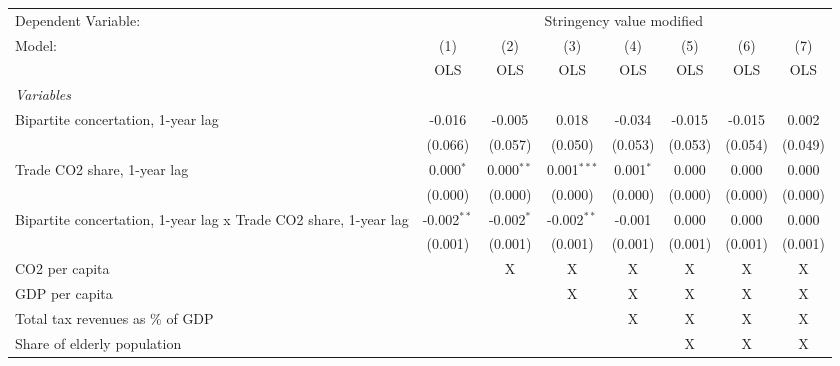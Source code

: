 
\begingroup
\centering
\begin{tabular}{lccccccc}
   \toprule
   Dependent Variable: & \multicolumn{7}{c}{Stringency value modified}\\
   Model:                                                           & (1)           & (2)          & (3)           & (4)         & (5)     & (6)     & (7)\\  
                                                                    &  OLS          & OLS          & OLS           & OLS         & OLS     & OLS     & OLS\\  
   \midrule
   \emph{Variables}\\
   Bipartite concertation, 1-year lag                               & -0.016        & -0.005       & 0.018         & -0.034      & -0.015  & -0.015  & 0.002\\   
                                                                    & (0.066)       & (0.057)      & (0.050)       & (0.053)     & (0.053) & (0.054) & (0.049)\\   
   Trade CO2 share, 1-year lag                                      & 0.000$^{*}$   & 0.000$^{**}$ & 0.001$^{***}$ & 0.001$^{*}$ & 0.000   & 0.000   & 0.000\\   
                                                                    & (0.000)       & (0.000)      & (0.000)       & (0.000)     & (0.000) & (0.000) & (0.000)\\   
   Bipartite concertation, 1-year lag x Trade CO2 share, 1-year lag & -0.002$^{**}$ & -0.002$^{*}$ & -0.002$^{**}$ & -0.001      & 0.000   & 0.000   & 0.000\\   
                                                                    & (0.001)       & (0.001)      & (0.001)       & (0.001)     & (0.001) & (0.001) & (0.001)\\   
   CO2 per capita                                                   &               & X            & X             & X           & X       & X       & X\\  
   GDP per capita                                                   &               &              & X             & X           & X       & X       & X\\  
   Total tax revenues as \% of GDP                                  &               &              &               & X           & X       & X       & X\\  
   Share of elderly population                                      &               &              &               &             & X       & X       & X\\  

\end{tabular}
